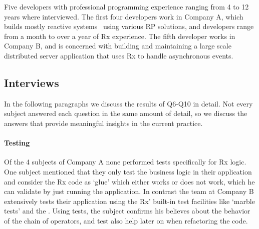 Five developers with professional programming experience ranging from 4 to 12 years where interviewed.
The first four developers work in Company A, which builds mostly reactive systems~\cite{boner2014reactive} using various RP solutions,
and developers range from a month to over a year of Rx experience. 
The fifth developer works in Company B, and is concerned with building and maintaining a large scale distributed server application that uses Rx to handle asynchronous events.

\subsection{Interviews}
In the following paragraphs we discuss the results of Q6-Q10 in detail. Not every subject answered each question in the same amount of detail, so we discuss the answers that provide meaningful insights in the current practice.

\paragraph{Testing}
Of the 4 subjects of Company A none performed tests specifically for Rx logic. One subject mentioned that they only test the business logic in their application and consider the Rx code as `glue' which either works or does not work, which he can validate by just running the application. In contrast the team at Company B extensively tests their application using the Rx' built-in test facilities like `marble tests' and the . Using tests, the subject confirms his believes about the behavior of the chain of operators, and test also help later on when refactoring the code.

